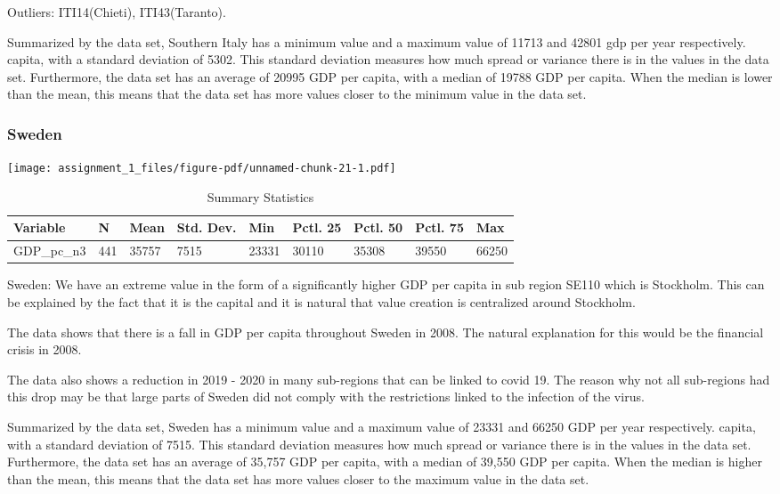 \documentclass[
  letterpaper,
  DIV=11,
  numbers=noendperiod]{scrartcl}
\begin{document}
Outliers: ITI14(Chieti), ITI43(Taranto).

Summarized by the data set, Southern Italy has a minimum value and a
maximum value of 11713 and 42801 gdp per year respectively. capita, with
a standard deviation of 5302. This standard deviation measures how much
spread or variance there is in the values in the data set. Furthermore,
the data set has an average of 20995 GDP per capita, with a median of
19788 GDP per capita. When the median is lower than the mean, this means
that the data set has more values closer to the minimum value in the
data set.

\hypertarget{sweden}{%
\subsubsection{Sweden}\label{sweden}}

\texttt{[image: assignment\_1\_files/figure-pdf/unnamed-chunk-21-1.pdf]}

\begin{table}

\caption{Summary Statistics}
\centering
\begin{tabular}[t]{lllllllll}
\toprule
Variable & N & Mean & Std. Dev. & Min & Pctl. 25 & Pctl. 50 & Pctl. 75 & Max\\
\midrule
GDP_pc_n3 & 441 & 35757 & 7515 & 23331 & 30110 & 35308 & 39550 & 66250\\
\bottomrule
\end{tabular}
\end{table}

Sweden: We have an extreme value in the form of a significantly higher
GDP per capita in sub region SE110 which is Stockholm. This can be
explained by the fact that it is the capital and it is natural that
value creation is centralized around Stockholm.

The data shows that there is a fall in GDP per capita throughout Sweden
in 2008. The natural explanation for this would be the financial crisis
in 2008.

The data also shows a reduction in 2019 - 2020 in many sub-regions that
can be linked to covid 19. The reason why not all sub-regions had this
drop may be that large parts of Sweden did not comply with the
restrictions linked to the infection of the virus.

Summarized by the data set, Sweden has a minimum value and a maximum
value of 23331 and 66250 GDP per year respectively. capita, with a
standard deviation of 7515. This standard deviation measures how much
spread or variance there is in the values in the data set. Furthermore,
the data set has an average of 35,757 GDP per capita, with a median of
39,550 GDP per capita. When the median is higher than the mean, this
means that the data set has more values closer to the maximum value in
the data set.
\end{document}
